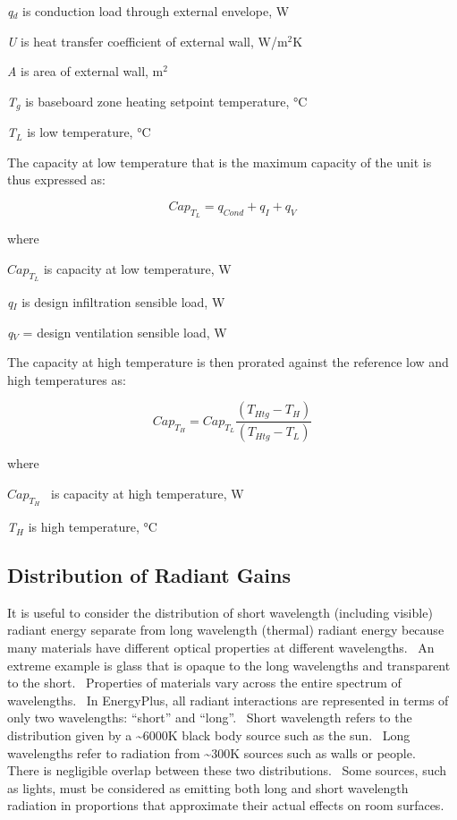 \emph{q\(_{d}\)} is conduction load through external envelope, W

\emph{U} is heat transfer coefficient of external wall, W/m\(^{2}\)K

\emph{A} is area of external wall, m\(^{2}\)

\emph{T\(_{g}\)} is baseboard zone heating setpoint temperature, °C

\emph{T\(_{L}\)} is low temperature, °C

The capacity at low temperature that is the maximum capacity of the unit is thus expressed as:

\begin{equation}
Ca{p_{{T_L}}} = {q_{Cond}} + {q_I} + {q_V}
\end{equation}

where

\(Ca{p_{{T_L}}}\) is capacity at low temperature, W

\emph{q\(_{I}\)} is design infiltration sensible load, W

\emph{q\(_{V}\)} = design ventilation sensible load, W

The capacity at high temperature is then prorated against the reference low and high temperatures as:

\begin{equation}
Ca{p_{{T_H}}} = Ca{p_{{T_L}}}\frac{{\left( {{T_{Htg}} - {T_H}} \right)}}{{\left( {{T_{Htg}} - {T_L}} \right)}}
\end{equation}

where

\(Ca{p_{{T_H}}}\) ~is capacity at high temperature, W

\emph{T\(_{H}\)} is high temperature, °C

\subsection{Distribution of Radiant Gains}\label{distribution-of-radiant-gains}

It is useful to consider the distribution of short wavelength (including visible) radiant energy separate from long wavelength (thermal) radiant energy because many materials have different optical properties at different wavelengths.~ An extreme example is glass that is opaque to the long wavelengths and transparent to the short.~ Properties of materials vary across the entire spectrum of wavelengths.~ In EnergyPlus, all radiant interactions are represented in terms of only two wavelengths: ``short'' and ``long''.~ Short wavelength refers to the distribution given by a \textasciitilde{}6000K black body source such as the sun.~ Long wavelengths refer to radiation from \textasciitilde{}300K sources such as walls or people.~ There is negligible overlap between these two distributions.~ Some sources, such as lights, must be considered as emitting both long and short wavelength radiation in proportions that approximate their actual effects on room surfaces.

